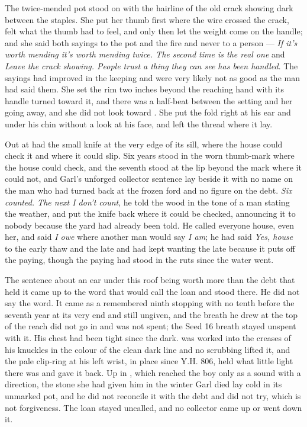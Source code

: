 The twice-mended pot stood on  with the hairline of the old crack showing dark between the staples. She put her thumb first where the wire crossed the crack, felt what the thumb had to feel, and only then let the weight come on the handle; and she said both sayings to the pot and the fire and never to a person --- \emph{If it's worth mending it's worth mending twice. The second time is the real one} and \emph{Leave the crack showing. People trust a thing they can see has been handled}. The sayings had improved in the keeping and were very likely not as good as the man had said them. She set the rim two inches beyond the reaching hand with its handle turned toward it, and there was a half-beat between the setting and her going away, and she did not look toward . She put the fold right at his ear and under his chin without a look at his face, and left the thread where it lay.

\scenebreak

Out at   had the small knife at the very edge of its sill, where the house could check it and where it could slip. Six years stood in the worn thumb-mark where the house could check, and the seventh stood at the lip beyond the mark where it could not, and Garl's unforged collector sentence lay beside it with no name on the man who had turned back at the frozen ford and no figure on the debt. \emph{Six counted. The next I don't count}, he told the wood in the tone of a man stating the weather, and put the knife back where it could be checked, announcing it to nobody because the yard had already been told. He called everyone house, even her, and said \emph{I owe} where another man would say \emph{I am}; he had said \emph{Yes, house} to the early thaw and the late and had kept wanting the late because it puts off the paying, though the paying had stood in the ruts since the water went.

The sentence about an ear under this roof being worth more than the debt that held it came up to the word that would call the loan and stood there. He did not say the word. It came as a remembered ninth stopping with no tenth before the seventh year at its very end and still ungiven, and the breath he drew at the top of the reach did not go in and was not spent; the Seed 16 breath stayed unspent with it. His chest had been tight since the dark.  was worked into the creases of his knuckles in the colour of the clean dark line and no scrubbing lifted it, and the pale clip-ring at his left wrist, in place since Y.H. 806, held what little light there was and gave it back. Up in , which reached the boy only as a sound with a direction, the stone she had given him in the winter Garl died lay cold in its unmarked pot, and he did not reconcile it with the debt and did not try, which is not forgiveness. The loan stayed uncalled, and no collector came up  or went down it.


